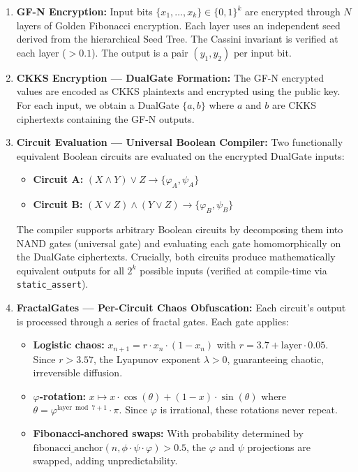 \documentclass[11pt,a4paper]{article}
\begin{document}
\begin{enumerate}[leftmargin=*,itemsep=4pt]
    \item \textbf{GF-N Encryption:} Input bits $\{x_1, \ldots, x_k\} \in \{0,1\}^k$ are encrypted through $N$ layers of Golden Fibonacci encryption. Each layer uses an independent seed derived from the hierarchical Seed Tree. The Cassini invariant is verified at each layer ($> 0.1$). The output is a pair $(y_1, y_2)$ per input bit.
    
    \item \textbf{CKKS Encryption — DualGate Formation:} The GF-N encrypted values are encoded as CKKS plaintexts and encrypted using the public key. For each input, we obtain a DualGate $\{a, b\}$ where $a$ and $b$ are CKKS ciphertexts containing the GF-N outputs.
    
    \item \textbf{Circuit Evaluation — Universal Boolean Compiler:} Two functionally equivalent Boolean circuits are evaluated on the encrypted DualGate inputs:
    \begin{itemize}[nosep]
        \item \textbf{Circuit A:} $(X \land Y) \lor Z \to \{\varphi_A, \psi_A\}$
        \item \textbf{Circuit B:} $(X \lor Z) \land (Y \lor Z) \to \{\varphi_B, \psi_B\}$
    \end{itemize}
    The compiler supports arbitrary Boolean circuits by decomposing them into NAND gates (universal gate) and evaluating each gate homomorphically on the DualGate ciphertexts. Crucially, both circuits produce mathematically equivalent outputs for all $2^k$ possible inputs (verified at compile-time via \texttt{static\_assert}).
    
    \item \textbf{FractalGates — Per-Circuit Chaos Obfuscation:} Each circuit's output is processed through a series of fractal gates. Each gate applies:
    \begin{itemize}[nosep]
        \item \textbf{Logistic chaos:} $x_{n+1} = r \cdot x_n \cdot (1 - x_n)$ with $r = 3.7 + \text{layer} \cdot 0.05$. Since $r > 3.57$, the Lyapunov exponent $\lambda > 0$, guaranteeing chaotic, irreversible diffusion.
        \item \textbf{$\varphi$-rotation:} $x \mapsto x \cdot \cos(\theta) + (1-x) \cdot \sin(\theta)$ where $\theta = \varphi^{\text{layer} \bmod 7 + 1} \cdot \pi$. Since $\varphi$ is irrational, these rotations never repeat.
        \item \textbf{Fibonacci-anchored swaps:} With probability determined by $\text{fibonacci\_anchor}(n, \phi \cdot \psi \cdot \varphi) > 0.5$, the $\varphi$ and $\psi$ projections are swapped, adding unpredictability.
    \end{itemize}
    

\end{enumerate}
\end{document}
